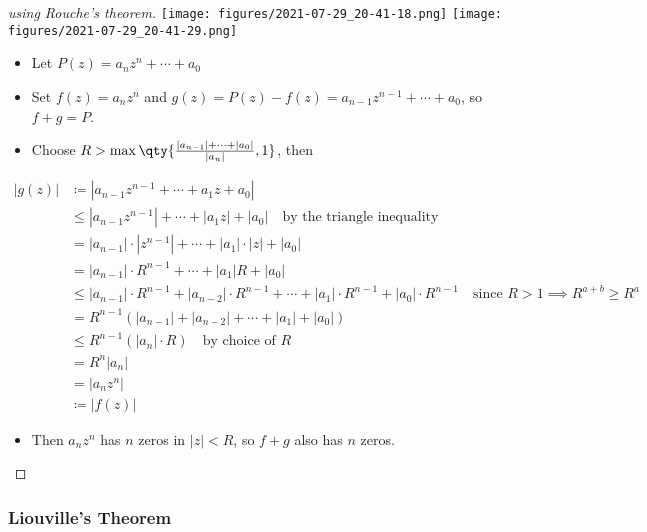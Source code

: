 \begin{proof}[using Rouche's theorem]

\texttt{[image: figures/2021-07-29\_20-41-18.png]}
\texttt{[image: figures/2021-07-29\_20-41-29.png]}

\begin{itemize}
\tightlist
\item
  Let \(P(z) = a_nz^n + \cdots + a_0\)
\item
  Set \(f(z) = a_n z^n\) and
  \(g(z) = P(z) - f(z) = a_{n-1}z^{n-1} + \cdots + a_0\), so
  \(f+g = P\).
\item
  Choose
  \(R > \max\qty{ { {\left\lvert {a_{n-1}} \right\rvert} + \cdots + {\left\lvert {a_0} \right\rvert} \over {\left\lvert {a_n} \right\rvert} }, 1}\),
  then
\end{itemize}

\begin{align*} |g(z)|  &\coloneqq|a_{n-1}z^{n-1} + \cdots + a_1 z + a_0 | \\ &\leq |a_{n-1}z^{n-1}| + \cdots + |a_1 z| + |a_0 | \quad\text{by the triangle inequality} \\ &= |a_{n-1}|\cdot |z^{n-1}| + \cdots + |a_1|\cdot| z| + |a_0 | \\ &=  |a_{n-1}|\cdot R^{n-1} + \cdots + |a_1| R + |a_0 | \\ &\leq |a_{n-1}|\cdot R^{n-1}+|a_{n-2}|\cdot R^{n-1} + \cdots + |a_1| \cdot R^{n-1} + |a_0 |\cdot R^{n-1} \quad\text{since } R>1 \implies R^{a+b} \geq R^a \\ &= R^{n-1} \left( |a_{n-1}| + |a_{n-2}| + \cdots + |a_1| + |a_0| \right) \\ &\leq R^{n-1} \left( |a_n|\cdot R \right) \quad\text{by choice of } R   \\ &= R^{n} |a_n| \\ &= |a_n z^n| \\ &\coloneqq|f(z)| \end{align*}

\begin{itemize}
\tightlist
\item
  Then \(a_n z^n\) has \(n\) zeros in
  \({\left\lvert {z} \right\rvert} < R\), so \(f+g\) also has \(n\)
  zeros.
\end{itemize}

\end{proof}

\hypertarget{liouvilles-theorem}{%
\subsubsection{Liouville's Theorem}\label{liouvilles-theorem}}

